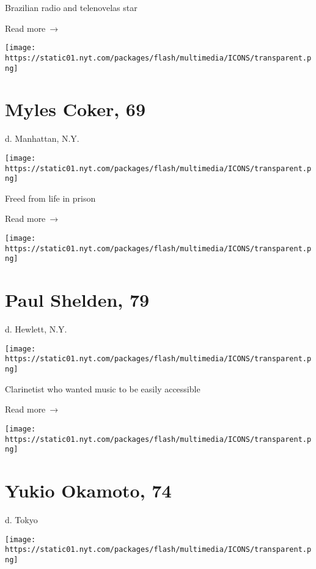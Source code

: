Brazilian radio and telenovelas star

 Read more~→

\href{https://www.nytimes.com/2020/05/08/nyregion/myles-coker-dead-coronavirus.html}{}

\texttt{[image: https://static01.nyt.com/packages/flash/multimedia/ICONS/transparent.png]}

\hypertarget{myles-coker-69}{%
\section{Myles Coker, 69}\label{myles-coker-69}}

d. Manhattan, N.Y.

\texttt{[image: https://static01.nyt.com/packages/flash/multimedia/ICONS/transparent.png]}

Freed from life in prison

 Read more~→

\href{https://www.nytimes.com/2020/05/08/obituaries/paul-shelden-dead-coronavirus.html}{}

\texttt{[image: https://static01.nyt.com/packages/flash/multimedia/ICONS/transparent.png]}

\hypertarget{paul-shelden-79}{%
\section{Paul Shelden, 79}\label{paul-shelden-79}}

d. Hewlett, N.Y.

\texttt{[image: https://static01.nyt.com/packages/flash/multimedia/ICONS/transparent.png]}

Clarinetist who wanted music to be easily accessible

 Read more~→

\href{https://www.nytimes.com/2020/05/08/obituaries/yukio-okamoto-coronavirus-dead.html}{}

\texttt{[image: https://static01.nyt.com/packages/flash/multimedia/ICONS/transparent.png]}

\hypertarget{yukio-okamoto-74}{%
\section{Yukio Okamoto, 74}\label{yukio-okamoto-74}}

d. Tokyo

\texttt{[image: https://static01.nyt.com/packages/flash/multimedia/ICONS/transparent.png]}


